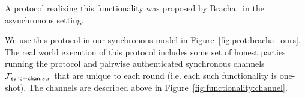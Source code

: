 %	
%	
A protocol realizing this functionality was proposed by Bracha~\cite{bracha} in the asynchronous setting.
%
%	
%

We use this protocol in our synchronous model in Figure~\ref{fig:prot:bracha_ours}.
The real world execution of this protocol includes some set of honest parties running the protocol and pairwise authenticated synchronous channels $\mathcal{F}_{{\mathsf {sync-chan}},s,r}$ that are unique to each round (i.e. each such functionality is one-shot).
The channels are described above in Figure~\ref{fig:functionality:channel}.

